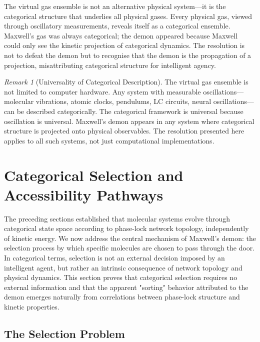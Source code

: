 \documentclass[12pt,a4paper]{article}
\theoremstyle{definition}
\theoremstyle{remark}
\newtheorem{remark}[theorem]{Remark}
\begin{document}
The virtual gas ensemble is not an alternative physical system—it is the categorical structure that underlies all physical gases. Every physical gas, viewed through oscillatory measurements, reveals itself as a categorical ensemble. Maxwell's gas was always categorical; the demon appeared because Maxwell could only see the kinetic projection of categorical dynamics. The resolution is not to defeat the demon but to recognise that the demon is the propagation of a projection, misattributing  categorical structure for intelligent agency.

\begin{remark}[Universality of Categorical Description]
\label{rem:universality_categorical}
The virtual gas ensemble is not limited to computer hardware. Any system with measurable oscillations—molecular vibrations, atomic clocks, pendulums, LC circuits, neural oscillations—can be described categorically. The categorical framework is universal because oscillation is universal. Maxwell's demon appears in any system where categorical structure is projected onto physical observables. The resolution presented here applies to all such systems, not just computational implementations.
\end{remark}

\section{Categorical Selection and Accessibility Pathways}
\label{sec:selection}

The preceding sections established that molecular systems evolve through categorical state space according to phase-lock network topology, independently of kinetic energy. We now address the central mechanism of Maxwell's demon: the selection process by which specific molecules are chosen to pass through the door. In categorical terms, selection is not an external decision imposed by an intelligent agent, but rather an intrinsic consequence of network topology and physical dynamics. This section proves that categorical selection requires no external information and that the apparent "sorting" behavior attributed to the demon emerges naturally from correlations between phase-lock structure and kinetic properties.

\subsection{The Selection Problem}
\end{document}
